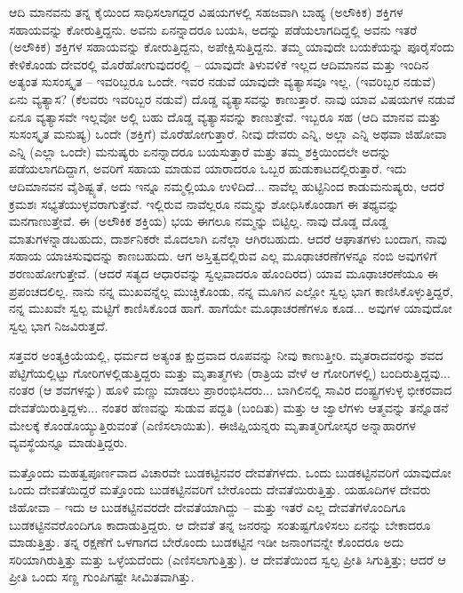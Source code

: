 ಆದಿ ಮಾನವನು ತನ್ನ ಕೈಯಿಂದ ಸಾಧಿಸಲಾಗದ್ದರ ವಿಷಯಗಳಲ್ಲಿ ಸಹಜವಾಗಿ ಬಾಹ್ಯ (ಅಲೌಕಿಕ) ಶಕ್ತಿಗಳ ಸಹಾಯವನ್ನು ಕೋರುತ್ತಿದ್ದನು. ಅವನು ಏನನ್ನಾದರೂ ಬಯಸಿ, ಅದನ್ನು ಪಡೆಯಲಾಗದಿದ್ದಲ್ಲಿ ಅವನು ಇತರೆ (ಅಲೌಕಿಕ) ಶಕ್ತಿಗಳ ಸಹಾಯವನ್ನು ಕೋರುತ್ತಿದ್ದನು, ಅಪೇಕ್ಷಿಸುತ್ತಿದ್ದನು. ತಮ್ಮ ಯಾವುದೇ ಬಯಕೆಯನ್ನು ಪೂರೈಸೆಂದು ಕೇಳಿಕೊಂಡು ದೇವರಲ್ಲಿ ಮೊರೆಹೋಗುವುದರಲ್ಲಿ – ಯಾವುದೇ ತಿಳುವಳಿಕೆ ಇಲ್ಲದ ಆದಿಮಾನವ ಮತ್ತು ಇಂದಿನ ಅತ್ಯಂತ ಸುಸಂಸ್ಕೃತ – ಇವರಿಬ್ಬರೂ ಒಂದೇ. ಇವರ ನಡುವೆ ಯಾವುದೇ ವ್ಯತ್ಯಾಸವೂ ಇಲ್ಲ. (ಇವರಿಬ್ಬರ ನಡುವೆ) ಏನು ವ್ಯತ್ಯಾಸ? (ಕೆಲವರು ಇವರಿಬ್ಬರ ನಡುವೆ) ದೊಡ್ಡ ವ್ಯತ್ಯಾಸವನ್ನು ಕಾಣುತ್ತಾರೆ. ನಾವು ಯಾವ ವಿಷಯಗಳ ನಡುವೆ ಏನೂ ವ್ಯತ್ಯಾಸವೇ ಇಲ್ಲವೋ ಅಲ್ಲಿ ಬಹು ದೊಡ್ಡ ವ್ಯತ್ಯಾಸವನ್ನು ಕಾಣುತ್ತೇವೆ. ಇಬ್ಬರೂ ಸಹ (ಆದಿ ಮಾನವ ಮತ್ತು ಸುಸಂಸ್ಕೃತ ಮನುಷ್ಯ) ಒಂದೇ (ಶಕ್ತಿಗೆ) ಮೊರೆಹೋಗುತ್ತಾರೆ. ನೀವು ದೇವರು ಎನ್ನಿ, ಅಲ್ಲಾ ಎನ್ನಿ ಅಥವಾ ಜಿಹೋವಾ ಎನ್ನಿ (ಎಲ್ಲಾ ಒಂದೇ) ಮನುಷ್ಯರು ಏನನ್ನಾದರೂ ಬಯಸುತ್ತಾರೆ ಮತ್ತು ತಮ್ಮ ಶಕ್ತಿಯಿಂದಲೇ ಅದನ್ನು ಪಡೆಯಲಾಗದಿದ್ದಾಗ, ಅವರಿಗೆ ಸಹಾಯ ಮಾಡುವ ಯಾರಾದರೂ ಒಬ್ಬರ ಹುಡುಕಾಟದಲ್ಲಿರುತ್ತಾರೆ. ಇದು ಆದಿಮಾನವನ ವೈಶಿಷ್ಟ್ಯತೆ, ಅದು ಇನ್ನೂ ನಮ್ಮಲ್ಲಿಯೂ ಉಳಿದಿದೆ... ನಾವೆಲ್ಲ ಹುಟ್ಟಿನಿಂದ ಕಾಡುಮನುಷ್ಯರು, ಆದರೆ ಕ್ರಮಶಃ ಸಭ್ಯತೆಯುಳ್ಳವರಾಗುತ್ತೇವೆ. ಇಲ್ಲಿರುವ ನಾವೆಲ್ಲರೂ ನಮ್ಮನ್ನು ಶೋಧಿಸಿಕೊಂಡಾಗ ಈ ತಥ್ಯವನ್ನು ಮನಗಾಣುತ್ತೇವೆ. ಈ (ಅಲೌಕಿಕ ಶಕ್ತಿಯ) ಭಯ ಈಗಲೂ ನಮ್ಮನ್ನು ಬಿಟ್ಟಿಲ್ಲ. ನಾವು ದೊಡ್ಡ ದೊಡ್ಡ ಮಾತುಗಳನ್ನಾಡಬಹುದು, ದಾರ್ಶನಿಕರೇ ಮೊದಲಾಗಿ ಏನೆಲ್ಲಾ ಆಗಿರಬಹುದು. ಆದರೆ ಆಘಾತಗಳು ಬಂದಾಗ, ನಾವು ಸಹಾಯ ಯಾಚಿಸುವುದನ್ನು ಕಾಣಬಹುದು. ಆಗ ಅಸ್ತಿತ್ವದಲ್ಲಿರುವ ಎಲ್ಲ ಮೂಢಾಚರಣೆಗಳನ್ನೂ ನಂಬಿ ಅವುಗಳಿಗೆ ಶರಣುಹೋಗುತ್ತೇವೆ. (ಆದರೆ ಸತ್ಯದ ಆಧಾರವನ್ನು ಸ್ವಲ್ಪವಾದರೂ ಹೊಂದಿರದ) ಯಾವ ಮೂಢಾಚರಣೆಯೂ ಈ ಪ್ರಪಂಚದಲಿಲ್ಲ. ನಾನು ನನ್ನ ಮುಖವನ್ನೆಲ್ಲ ಮುಚ್ಚಿಕೊಂಡು, ನನ್ನ ಮೂಗಿನ ಎಲ್ಲೋ ಸ್ವಲ್ಪ ಭಾಗ ಕಾಣಿಸಿಕೊಳ್ಳುತ್ತಿದ್ದರೆ, ನನ್ನ ಮುಖವೇ ಸ್ವಲ್ಪ ಮಟ್ಟಿಗೆ ಕಾಣಿಸಿಕೊಂಡ ಹಾಗೆ. ಹಾಗೆಯೇ ಮೂಢಾಚರಣೆಗಳೂ ಕೂಡ... ಅವುಗಳ ಯಾವುದೋ ಸ್ವಲ್ಪ ಭಾಗ ನಿಜವಿರುತ್ತದೆ.

\vskip 4pt

ಸತ್ತವರ ಅಂತ್ಯಕ್ರಿಯೆಯಲ್ಲಿ, ಧರ್ಮದ ಅತ್ಯಂತ ಕ್ಷುದ್ರವಾದ ರೂಪವನ್ನು ನೀವು ಕಾಣುತ್ತೀರಿ. ಮೃತರಾದವರನ್ನು ಶವದ ಪೆಟ್ಟಿಗೆಯಲ್ಲಿಟ್ಟು ಗೋರಿಗಳಲ್ಲಿಡುತ್ತಿದ್ದರು ಮತ್ತು ಮೃತಾತ್ಮಗಳು (ರಾತ್ರಿಯ ವೇಳೆ ಆ ಗೋರಿಗಳಲ್ಲಿ) ಬಂದಿರುತ್ತಿದ್ದವು... ನಂತರ (ಆ ಶವಗಳನ್ನು) ಹೂಳಿ ಮಣ್ಣು ಮಾಡಲು ಪ್ರಾರಂಭಿಸಿದರು... ಬಾಗಿಲಿನಲ್ಲಿ ಸಾವಿರ ದಂಷ್ಟ್ರಗಳುಳ್ಳ ಭೀಕರವಾದ ದೇವತೆಯಿರುತ್ತಿದ್ದಳು... ನಂತರ ಹೆಣವನ್ನು ಸುಡುವ ಪದ್ದತಿ (ಬಂದಿತು) ಮತ್ತು ಆ ಜ್ವಾಲೆಗಳು ಆತ್ಮವನ್ನು ತನ್ನೊಡನೆ ಮೇಲಕ್ಕೆ ಕೊಂಡೊಯ್ಯುತ್ತಿರುವಂತೆ (ಎಣಿಸಲಾಯಿತು). ಈಜಿಪ್ಷಿಯನ್ನರು ಮೃತಾತ್ಮರಿಗೋಸ್ಕರ ಅನ್ನಾಹಾರಗಳ ವ್ಯವಸ್ಥೆಯನ್ನೂ ಮಾಡುತ್ತಿದ್ದರು.

\vskip 4pt

ಮತ್ತೊಂದು ಮಹತ್ವಪೂರ್ಣವಾದ ವಿಚಾರವೇ ಬುಡಕಟ್ಟಿನವರ ದೇವತೆಗಳದು. ಒಂದು ಬುಡಕಟ್ಟಿನವರಿಗೆ ಯಾವುದೋ ಒಂದು ದೇವತೆಯಿದ್ದರೆ ಮತ್ತೊಂದು ಬುಡಕಟ್ಟಿನವರಿಗೆ ಬೇರೊಂದು ದೇವತೆಯಿರುತ್ತಿತ್ತು. ಯಹೂದಿಗಳ ದೇವರು ಜಿಹೋವಾ – ಇದು ಆ ಬುಡಕಟ್ಟಿನವರದೇ ದೇವತೆಯಾಗಿದ್ದು – ಮತ್ತು ಇತರೆ ಎಲ್ಲ ದೇವತೆಗಳೊಂದಿಗೂ ಬುಡಕಟ್ಟಿನವರೊಂದಿಗೂ ಕಾದಾಡುತ್ತಿದ್ದರು. ಆ ದೇವತೆ ತನ್ನ ಜನರನ್ನು ಸಂತುಷ್ಟಗೊಳಿಸಲು ಏನನ್ನು ಬೇಕಾದರೂ ಮಾಡುತ್ತಿತ್ತು. ತನ್ನ ರಕ್ಷಣೆಗೆ ಒಳಗಾಗದ ಬೇರೊಂದು ಬುಡಕಟ್ಟಿನ ಇಡೀ ಜನಾಂಗವನ್ನೇ ಕೊಂದರೂ ಅದು ಸರಿಯಾಗಿರುತ್ತಿತ್ತು ಮತ್ತು ಒಳ್ಳೆಯದೆಂದು (ಎಣಿಸಲಾಗುತ್ತಿತ್ತು). ಆ ದೇವತೆಯಿಂದ ಸ್ವಲ್ಪ ಪ್ರೀತಿ ಸಿಗುತ್ತಿತ್ತು; ಆದರೆ ಆ ಪ್ರೀತಿ ಒಂದು ಸಣ್ಣ ಗುಂಪಿಗಷ್ಟೇ ಸೀಮಿತವಾಗಿತ್ತು.

